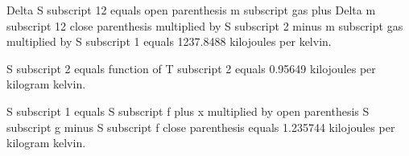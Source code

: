 Delta S subscript 12 equals open parenthesis m subscript gas plus Delta m subscript 12 close parenthesis multiplied by S subscript 2 minus m subscript gas multiplied by S subscript 1 equals 1237.8488 kilojoules per kelvin.  

S subscript 2 equals function of T subscript 2 equals 0.95649 kilojoules per kilogram kelvin.  

S subscript 1 equals S subscript f plus x multiplied by open parenthesis S subscript g minus S subscript f close parenthesis equals 1.235744 kilojoules per kilogram kelvin.